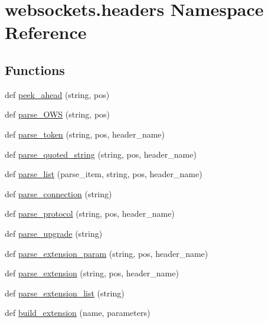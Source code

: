 \hypertarget{namespacewebsockets_1_1headers}{}\section{websockets.\+headers Namespace Reference}
\label{namespacewebsockets_1_1headers}
\subsection*{Functions}
\begin{DoxyCompactItemize}
\item 
def \hyperlink{namespacewebsockets_1_1headers_a1110b931117dfe61db33cd7c03370610}{peek\+\_\+ahead} (string, pos)
\item 
def \hyperlink{namespacewebsockets_1_1headers_a0326f166bddb44c6571ddb36ce8e410c}{parse\+\_\+\+O\+WS} (string, pos)
\item 
def \hyperlink{namespacewebsockets_1_1headers_a49b06afdce23783ce96048511261e115}{parse\+\_\+token} (string, pos, header\+\_\+name)
\item 
def \hyperlink{namespacewebsockets_1_1headers_a48a461909e822e87a1cde3ff7299d7b2}{parse\+\_\+quoted\+\_\+string} (string, pos, header\+\_\+name)
\item 
def \hyperlink{namespacewebsockets_1_1headers_a402e72e1d27761676dd17957a281c88e}{parse\+\_\+list} (parse\+\_\+item, string, pos, header\+\_\+name)
\item 
def \hyperlink{namespacewebsockets_1_1headers_a74bd8bbf96afdae6f04582aeb6949618}{parse\+\_\+connection} (string)
\item 
def \hyperlink{namespacewebsockets_1_1headers_a396d72b69da6d8130b217f6c7d3cd3b8}{parse\+\_\+protocol} (string, pos, header\+\_\+name)
\item 
def \hyperlink{namespacewebsockets_1_1headers_a29f24b4011fc6e1958da1f8585b5db37}{parse\+\_\+upgrade} (string)
\item 
def \hyperlink{namespacewebsockets_1_1headers_a777254dc2f4beda6277896d1230b161b}{parse\+\_\+extension\+\_\+param} (string, pos, header\+\_\+name)
\item 
def \hyperlink{namespacewebsockets_1_1headers_a4b02ba1a387434731b7cbfed858886f1}{parse\+\_\+extension} (string, pos, header\+\_\+name)
\item 
def \hyperlink{namespacewebsockets_1_1headers_a9e8033055d7efda10834d20e1b3cd141}{parse\+\_\+extension\+\_\+list} (string)
\item 
def \hyperlink{namespacewebsockets_1_1headers_ae0d3fad127ef68b2c2f7976c98966011}{build\+\_\+extension} (name, parameters)

\end{DoxyCompactItemize}
